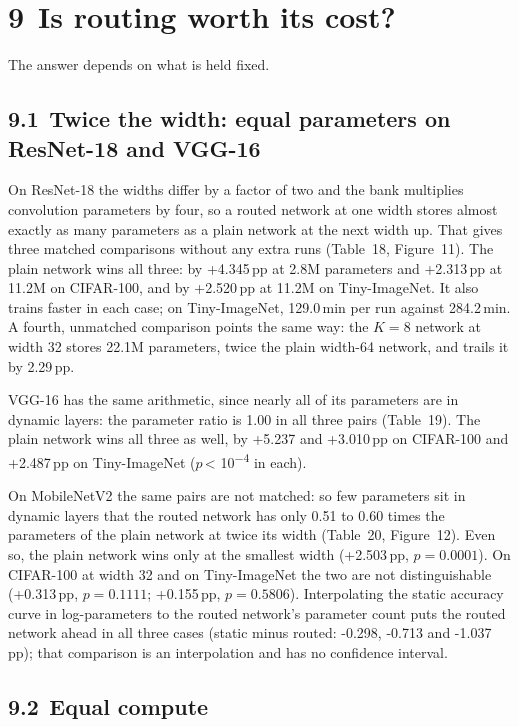 \documentclass{article}
\begin{document}
\section*{9 Is routing worth its cost?}

The answer depends on what is held fixed.

\subsection*{9.1 Twice the width: equal parameters on ResNet-18 and VGG-16}

On ResNet-18 the widths differ by a factor of two and the bank multiplies
convolution parameters by four, so a routed network at one width stores
almost exactly as many parameters as a plain network at the next width
up. That gives three matched comparisons without any extra runs
(Table~18, Figure~11). The plain network
wins all three: by +4.345\,pp at 2.8M parameters and +2.313\,pp at 11.2M
on CIFAR-100, and by +2.520\,pp at 11.2M on Tiny-ImageNet. It also trains
faster in each case; on Tiny-ImageNet, 129.0\,min per run against
284.2\,min. A fourth, unmatched comparison points the same way: the
$K=8$ network at width 32 stores 22.1M parameters, twice the plain
width-64 network, and trails it by 2.29\,pp.

VGG-16 has the same arithmetic, since nearly all of its parameters are in
dynamic layers: the parameter ratio is 1.00 in all three pairs
(Table~19). The plain network wins all three as well, by
+5.237 and +3.010\,pp on CIFAR-100 and +2.487\,pp on
Tiny-ImageNet ($p$\,< 10\textsuperscript{−4} in each).

On MobileNetV2 the same pairs are not matched: so few parameters sit in
dynamic layers that the routed network has only 0.51 to 0.60
times the parameters of the plain network at twice its width
(Table~20, Figure~12). Even so, the
plain network wins only at the smallest width (+2.503\,pp,
$p=0.0001$). On CIFAR-100 at width 32 and on Tiny-ImageNet the two are
not distinguishable (+0.313\,pp, $p=0.1111$; +0.155\,pp,
$p=0.5806$). Interpolating the static accuracy curve in
log-parameters to the routed network's parameter count puts the routed
network ahead in all three cases (static minus routed: -0.298,
-0.713 and -1.037\,pp); that comparison is an interpolation and has
no confidence interval.

\subsection*{9.2 Equal compute}
\end{document}
